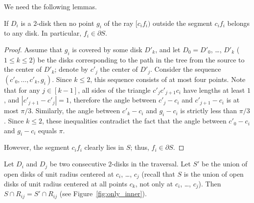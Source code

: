 
We need the following lemmas.

\begin{lemma}
If $D_i$ is a $2$-disk then no point $g_i$ of the ray $[c_if_i)$ outside the segment $c_if_i$ belongs to any disk. In particular, $f_i\in\partial S$.
\label{lemma:far}
\end{lemma}

\begin{proof}
Assume that $g_i$ is covered by some disk $D'_k$, and let $D_0 = D'_0$, \ldots, $D'_k$ ($1\leq k\leq 2$) be the disks corresponding to the path in the tree from the source to the center of $D'_k$; denote by $c'_j$ the center of $D'_j$. Consider the sequence $(c'_0, \ldots, c'_k, g_i)$. Since $k\leq 2$, this sequence consists of at most four points. Note that for any $j\in[k - 1]$, all sides of the triangle $c'_jc'_{j+1}c_i$ have lengths at least $1$, and $|c'_{j+1} - c'_j| = 1$, therefore the angle between $c'_j - c_i$ and $c'_{j+1} - c_i$ is at most $\pi/3$. Similarly, the angle between $c'_k - c_i$ and $g_i - c_i$ is strictly less than $\pi/3$. Since $k\leq 2$, these inequalities contradict the fact that the angle between $c'_0 - c_i$ and $g_i - c_i$ equals $\pi$.

However, the segment $c_if_i$ clearly lies in $S$; thus, $f_i\in\partial{S}$.
\end{proof}


\begin{lemma}
Let $D_i$ and $D_j$ be two consecutive $2$-disks in the traversal. Let $S'$ be the union of open disks of unit radius centered at $c_i$, \ldots, $c_j$ (recall that $S$ is the union of open disks of unit radius centered at all points $c_k$, not only at $c_i$, \ldots, $c_j$). Then $S\cap R_{ij} = S'\cap R_{ij}$  (see Figure~\ref{fig:only_inner}).

\label{lemma:only_inner}
\end{lemma}

